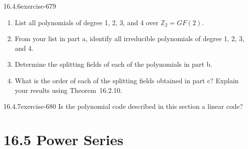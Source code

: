 \documentclass[twoside,10pt,]{book}
\numberwithin{equation}{section}
\begin{document}
\begin{divisionsolution}{16.4.6}{}{exercise-679}%
\hypertarget{p-6056}{}%
\leavevmode%
\begin{enumerate}[label=(\alph*)]
\item\hypertarget{li-2681}{}\hypertarget{p-6057}{}%
List all polynomials of degree 1, 2, 3, and 4 over \(\mathbb{Z}_2 = GF(2)\).%
\item\hypertarget{li-2682}{}\hypertarget{p-6058}{}%
From your list in part a, identify all irreducible polynomials of degree 1, 2, 3, and 4.%
\item\hypertarget{li-2683}{}\hypertarget{p-6059}{}%
Determine the splitting fields of each of the polynomials in part b.%
\item\hypertarget{li-2684}{}\hypertarget{p-6060}{}%
What is the order of each of the splitting fields obtained in part c? Explain your results using Theorem~16.2.10.%
\end{enumerate}
%
\end{divisionsolution}%
\begin{divisionsolution}{16.4.7}{}{exercise-680}%
\hypertarget{p-6061}{}%
Is the polynomial code described in this section a linear code?%
\end{divisionsolution}%
\section*{16.5 Power Series}
\end{document}
